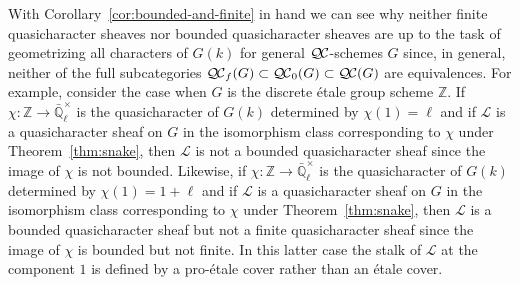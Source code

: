 \documentclass{amsart}
\theoremstyle{plain}
\theoremstyle{definition}
\theoremstyle{remark}
\newcommand{\ZZ}{{\mathbb{Z}}}
\newcommand{\EE}{\mathbb{\bar Q}_\ell}
\newcommand{\Fq}{k}
\newcommand{\EEx}{\EE^\times}
\newcommand{\qcs}[1]{{\mathcal{#1}}}
\newcommand{\QC}{{\mathcal{Q\hskip-0.8pt C}}}
\newcommand{\QCb}{{\QC_0}}
\newcommand{\QCf}{{\QC_f}}
\begin{document}
With Corollary~\ref{cor:bounded-and-finite} in hand 
we can see why neither finite quasicharacter sheaves nor bounded quasicharacter sheaves 
are up to the task of geometrizing all characters of $G(\Fq)$ for general $\QC$-schemes $G$ since, in general, neither of the full subcategories
$\QCf(G) \subset \QCb(G) \subset \QC(G)$ are equivalences.
For example, consider the case when $G$ is the discrete \'etale group scheme $\ZZ$.
If $\chi : \ZZ \to \EEx$ is the quasicharacter of $G(\Fq)$ determined by $\chi(1) = \ell$ 
and if $\qcs{L}$ is a quasicharacter sheaf on $G$ in the isomorphism class 
corresponding to $\chi$ under Theorem~\ref{thm:snake},
then $\qcs{L}$ is not a bounded quasicharacter sheaf since the image of $\chi$ is not
bounded.  
Likewise, if $\chi : \ZZ \to \EEx$ is the quasicharacter of $G(\Fq)$ determined by $\chi(1) = 1+\ell$ 
and if $\qcs{L}$ is a quasicharacter sheaf on $G$ in the isomorphism class 
corresponding to $\chi$ under Theorem~\ref{thm:snake},
then $\qcs{L}$ is a bounded quasicharacter sheaf but not a finite quasicharacter sheaf
since the image of $\chi$ is bounded but not finite.
In this latter case the stalk of $\qcs{L}$ at the component $1$ is defined
by a pro-\'etale cover rather than an \'etale cover.




\end{document}
